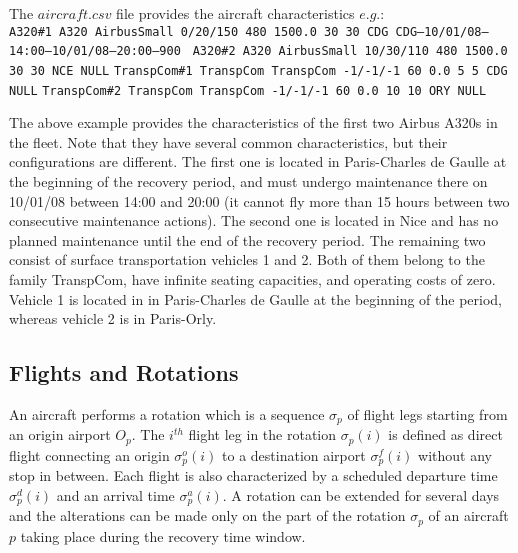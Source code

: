 \documentclass[ijoo,nonblindrev]{informs-ijoo}
\begin{document}
The $aircraft.csv$ file provides the aircraft characteristics $e.g.$:\\
\newline
{\texttt{\footnotesize A320\#1 A320 AirbusSmall 0/20/150 480 1500.0 30 30 CDG CDG–10/01/08–14:00–10/01/08–20:00–900 }}
{\texttt{\footnotesize A320\#2 A320 AirbusSmall 10/30/110 480 1500.0 30 30 NCE NULL}}
\newline
{\texttt{\footnotesize TranspCom\#1 TranspCom TranspCom -1/-1/-1 60 0.0 5 5 CDG NULL}}
\newline
{\texttt{\footnotesize TranspCom\#2 TranspCom TranspCom -1/-1/-1 60 0.0 10 10 ORY NULL}}
\newline

The above example provides the characteristics of the first two Airbus A320s in the fleet. Note that they have several common characteristics, but their configurations are different. The first one is located in Paris-Charles de Gaulle at the beginning of the recovery period, and must undergo maintenance there on 10/01/08 between 14:00 and 20:00 (it cannot fly more than 15 hours between two consecutive maintenance actions). The second one is located in Nice and has no planned
maintenance until the end of the recovery period. The remaining two consist of surface transportation vehicles 1 and 2. Both of them belong to the family TranspCom, have infinite seating capacities, and operating costs of zero. Vehicle 1 is located in in Paris-Charles de Gaulle at the beginning of the period, whereas vehicle 2 is in Paris-Orly.

\subsection{Flights and Rotations} \label{subsec:flightsRotations}

An aircraft performs a rotation which is a sequence $ \sigma_p$ of flight legs starting from an origin airport $O_p$. The $i^{th}$ flight leg in the rotation $ \sigma_p(i)$ is defined as direct flight connecting an origin $ \sigma^o_p(i)$  to a destination airport $ \sigma^f_p(i)$  without any stop in between. Each flight is also characterized by a scheduled departure time $ \sigma^d_p(i)$  and an arrival time $ \sigma^a_p(i)$. A rotation can be extended for several days and the alterations can be made only on the part of the rotation $ \sigma_p$ of an aircraft $p$ taking place during the recovery time window.\\
\end{document}
